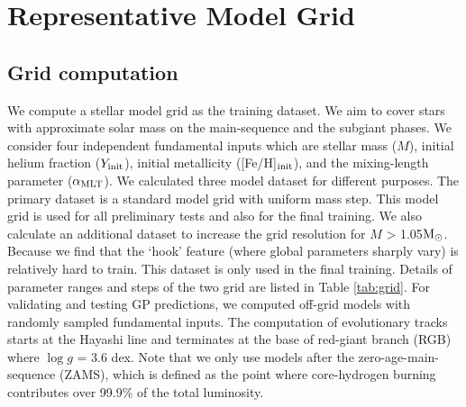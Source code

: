 \section{Representative Model Grid}\label{sec:grid}

\subsection{Grid computation}

We compute a stellar model grid as the training dataset. We aim to cover stars with approximate solar mass on the main-sequence and the subgiant phases. We consider four independent fundamental inputs which are stellar mass ($M$), initial helium fraction ($Y_{\rm init}$), initial metallicity ([Fe/H]$_{\rm init}$), and the mixing-length parameter ($\alpha_{\rm MLT}$). 
%
We calculated three model dataset for different purposes. The primary dataset is a standard model grid with uniform mass step. This model grid is used for all preliminary tests and also for the final training. 
%
We also calculate an additional dataset to increase the grid resolution for $M$ > 1.05$\rm M_{\odot}$. Because we find that the `hook' feature (where global parameters sharply vary) is relatively hard to train. This dataset is only used in the final training. 
Details of parameter ranges and steps of the two grid are listed in Table \ref{tab:grid}. 
%
For validating and testing GP predictions, we computed off-grid models with randomly sampled fundamental inputs. 
%
%
The computation of evolutionary tracks starts at the Hayashi line and terminates at the base of red-giant branch (RGB) where $\log g$ = 3.6 dex. Note that we only use models after the zero-age-main-sequence (ZAMS), which is defined as the point where core-hydrogen burning contributes over 99.9\% of the total luminosity. 
%

